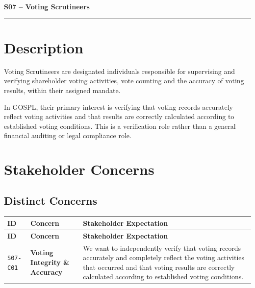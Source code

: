 \documentclass[11pt,a4paper]{article}
\begin{document}

{\LARGE\bfseries S07 -- Voting Scrutineers\par}\vspace{1em}
\noindent\rule{\linewidth}{0.4pt}

\section*{Description}

Voting Scrutineers are designated individuals responsible for supervising and verifying shareholder voting activities, vote counting and the accuracy of voting results, within their assigned mandate.

In GOSPL, their primary interest is verifying that voting records accurately reflect voting activities and that results are correctly calculated according to established voting conditions. This is a verification role rather than a general financial auditing or legal compliance role.

\section*{Stakeholder Concerns}

\subsection*{Distinct Concerns}

\begingroup\small
\begin{longtable}{@{}>{\raggedright\arraybackslash}p{}>{\raggedright\arraybackslash}p{}>{\raggedright\arraybackslash}p{}@{}}
\toprule
\textbf{ID} & \textbf{Concern} & \textbf{Stakeholder Expectation} \\
\midrule
\endfirsthead
\toprule
\textbf{ID} & \textbf{Concern} & \textbf{Stakeholder Expectation} \\
\midrule
\endhead
\bottomrule
\endfoot
\texttt{S07-C01} & \textbf{Voting Integrity \& Accuracy} & We want to independently verify that voting records accurately and completely reflect the voting activities that occurred and that voting results are correctly calculated according to established voting conditions. \\
\end{longtable}
\endgroup

\end{document}
